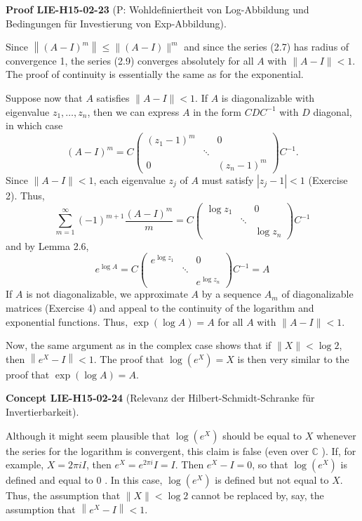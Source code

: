 \documentclass[10pt, letterpaper]{article}
\newcommand{\CustomHeading}[3]{%
  \par\medskip\noindent%
  \textbf{#1 #2} \textnormal{(#3)}.\enskip%
}
\newenvironment{CONC}[2]{\begin{unitbox}\CustomHeading{Concept}{#1}{#2}}{\end{unitbox}}
\newenvironment{PROOF}[2]{\begin{unitbox}\CustomHeading{Proof}{#1}{#2}}{\end{unitbox}}
\begin{document}
\begin{PROOF}{LIE-H15-02-23}{P: Wohldefiniertheit von Log-Abbildung und Bedingungen für Investierung von Exp-Abbildung}
Since $\left\|(A-I)^{m}\right\| \leq\|(A-I)\|^{m}$ and since the series (2.7) has radius of convergence 1, the series (2.9) converges absolutely for all $A$ with $\|A-I\|<1$. The proof of continuity is essentially the same as for the exponential.

Suppose now that $A$ satisfies $\|A-I\|<1$. If $A$ is diagonalizable with eigenvalue $z_{1}, \ldots, z_{n}$, then we can express $A$ in the form $C D C^{-1}$ with $D$ diagonal, in which case
$$
(A-I)^{m}=C\left(\begin{array}{ccc}
\left(z_{1}-1\right)^{m} & & 0 \\
& \ddots & \\
0 & & \left(z_{n}-1\right)^{m}
\end{array}\right) C^{-1} .
$$
Since $\|A-I\|<1$, each eigenvalue $z_{j}$ of $A$ must satisfy $\left|z_{j}-1\right|<1$ (Exercise 2). Thus,
$$
\sum_{m=1}^{\infty}(-1)^{m+1} \frac{(A-I)^{m}}{m}=C\left(\begin{array}{ccc}
\log z_{1} & & 0 \\
& \ddots & \\
& & \log z_{n}
\end{array}\right) C^{-1}
$$
and by Lemma 2.6,
$$
e^{\log A}=C\left(\begin{array}{ccc}
e^{\log z_{1}} & & 0 \\
& \ddots & \\
& & e^{\log z_{n}}
\end{array}\right) C^{-1}=A
$$
If $A$ is not diagonalizable, we approximate $A$ by a sequence $A_{m}$ of diagonalizable matrices (Exercise 4) and appeal to the continuity of the logarithm and exponential functions. Thus, $\exp (\log A)=A$ for all $A$ with $\|A-I\|<1$.

Now, the same argument as in the complex case shows that if $\|X\|<\log 2$, then $\left\|e^{X}-I\right\|<1$. The proof that $\log \left(e^{X}\right)=X$ is then very similar to the proof that $\exp (\log A)=A$.
\end{PROOF}


\begin{CONC}{LIE-H15-02-24}{Relevanz der Hilbert-Schmidt-Schranke für Invertierbarkeit}
Although it might seem plausible that $\log \left(e^{X}\right)$ should be equal to $X$ whenever the series for the logarithm is convergent, this claim is false (even over $\mathbb{C}$ ). If, for example, $X=2 \pi i I$, then $e^{X}=e^{2 \pi i} I=I$. Then $e^{X}-I=0$, so that $\log \left(e^{X}\right)$ is defined and equal to 0 . In this case, $\log \left(e^{X}\right)$ is defined but not equal to $X$. Thus, the assumption that $\|X\|<\log 2$ cannot be replaced by, say, the assumption that $\left\|e^{X}-I\right\|<1$.
\end{CONC}
\end{document}

